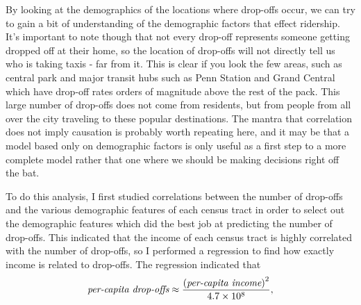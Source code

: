 \documentclass[11pt]{article}
\begin{document}
By looking at the demographics of the locations where drop-offs occur, we can try to gain a bit of understanding of the demographic factors that effect ridership.
It's important to note though that not every drop-off represents someone getting dropped off at their home, so the location of drop-offs will not directly tell us who is taking taxis - far from it. This is clear if you look the few areas, such as central park and major transit hubs such as Penn Station and Grand Central which have drop-off rates orders of magnitude above the rest of the pack.
This large number of drop-offs does not come from residents, but from people from all over the city traveling to these popular destinations.
The mantra that correlation does not imply causation is probably worth repeating here, and it may be that a model based only on demographic factors is only useful as a first step to a more complete model rather that one where we should be making decisions right off the bat.





To do this analysis, I first studied correlations between the number of drop-offs and the various demographic features of each census tract in order to select out the demographic features which did the best job at predicting the number of drop-offs.
This indicated that the income of each census tract is highly correlated with the number of drop-offs, so I performed a regression to find how exactly income is related to drop-offs. The regression indicated that 
\begin{equation}
  \label{eq:PoissonFit}
  \mbox{\it per-capita drop-offs} \approx \frac{\left(\mbox{\it per-capita income}\right)^2}{4.7\times 10^8},
\end{equation}
\end{document}
